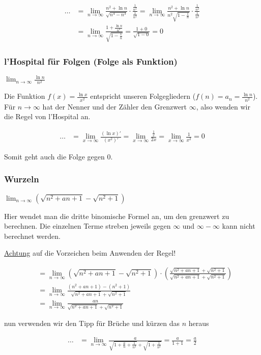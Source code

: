 \begin{align*}
\ldots &= \lim_{n \to \infty} \frac{n^2 + \ln n}{\sqrt{n^4 - n^3}}
\cdot \frac{\frac{1}{n^2}}{\frac{1}{n^2}} = \lim_{n \to \infty} \frac{n^2 + \ln
n}{n^2 \sqrt{1 - \frac{1}{n}}} \cdot \frac{\frac{1}{n^2}}{\frac{1}{n^2}} \\
&= \lim_{n \to \infty} \frac{1 + \frac{\ln n}{n^2}}{\sqrt{1 - \frac{1}{n}}}
= \frac{1 + 0}{\sqrt{1 - 0}} = 0
\end{align*}

\subsubsection{l'Hospital für Folgen (Folge als Funktion)}
$\lim_{n \to \infty} \frac{\ln n}{n^2}$

Die Funktion $f(x) = \frac{\ln x}{x^2}$ entspricht unseren Folgegliedern ($f(n)
= a_n = \frac{\ln n}{n^2}$). Für $n \to \infty$ hat der Nenner und der Zähler
den Grenzwert $\infty$, also wenden wir die Regel von l'Hospital an.

\begin{align*}
\ldots &= \lim_{x \to \infty} \frac{(\ln x)'}{(x^2)'} = \lim_{x \to \infty}
\frac{\frac{1}{x}}{2x} = \lim_{x \to \infty} \frac{1}{x^2} = 0
\end{align*}

Somit geht auch die Folge gegen 0.

\subsubsection{Wurzeln}
$\lim_{n \to \infty} (\sqrt{n^2 + an + 1} - \sqrt{n^2 + 1})$

Hier wendet man die dritte binomische Formel an, um den grenzwert zu berechnen.
Die einzelnen Terme streben jeweils gegen $\infty$ und $\infty - \infty$ kann
nicht berechnet werden.

\underline{Achtung} auf die Vorzeichen beim Anwenden der Regel!

\begin{align*}
&= \lim_{n \to \infty} (\sqrt{n^2 + an + 1} - \sqrt{n^2 + 1}) \cdot
\left(\frac{\sqrt{n^2 + an + 1} + \sqrt{n^2 + 1}}{\sqrt{n^2 + an + 1} +
\sqrt{n^2 + 1}} \right) \\
&= \lim_{n \to \infty} \frac{(n^2 + an + 1) - (n^2 + 1)}{\sqrt{n^2 + an + 1} +
\sqrt{n^2 + 1}} \\
&= \lim_{n \to \infty} \frac{an}{\sqrt{n^2 + an + 1} + \sqrt{n^2 + 1}} 
\end{align*}

nun verwenden wir den Tipp für Brüche und kürzen das $n$ heraus

\begin{align*}
\ldots &= \lim_{n \to \infty} \frac{a}{\sqrt{1 + \frac{a}{n} + \frac{1}{n^2}} +
\sqrt{1 + \frac{1}{n^2}}} = \frac{a}{1 + 1} = \frac{a}{2}
\end{align*}

